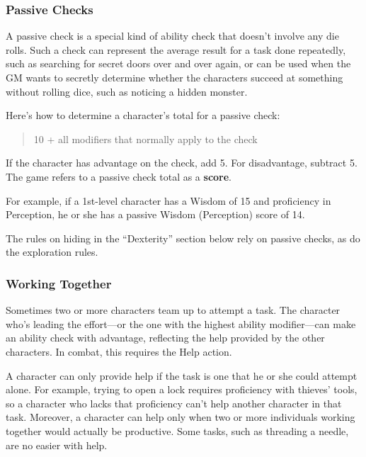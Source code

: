 \documentclass[
]{article}
\begin{document}
\hypertarget{passive-checks}{%
\subsubsection{Passive Checks}\label{passive-checks}}

A passive check is a special kind of ability check that doesn't involve
any die rolls. Such a check can represent the average result for a task
done repeatedly, such as searching for secret doors over and over again,
or can be used when the GM wants to secretly determine whether the
characters succeed at something without rolling dice, such as noticing a
hidden monster.

Here's how to determine a character's total for a passive check:

\begin{quote}
10 + all modifiers that normally apply to the check
\end{quote}

If the character has advantage on the check, add 5. For disadvantage,
subtract 5. The game refers to a passive check total as a
\textbf{score}.

For example, if a 1st-level character has a Wisdom of 15 and proficiency
in Perception, he or she has a passive Wisdom (Perception) score of 14.

The rules on hiding in the ``Dexterity'' section below rely on passive
checks, as do the exploration rules.

\hypertarget{working-together}{%
\subsubsection{Working Together}\label{working-together}}

Sometimes two or more characters team up to attempt a task. The
character who's leading the effort---or the one with the highest ability
modifier---can make an ability check with advantage, reflecting the help
provided by the other characters. In combat, this requires the Help
action.

A character can only provide help if the task is one that he or she
could attempt alone. For example, trying to open a lock requires
proficiency with thieves' tools, so a character who lacks that
proficiency can't help another character in that task. Moreover, a
character can help only when two or more individuals working together
would actually be productive. Some tasks, such as threading a needle,
are no easier with help.
\end{document}
